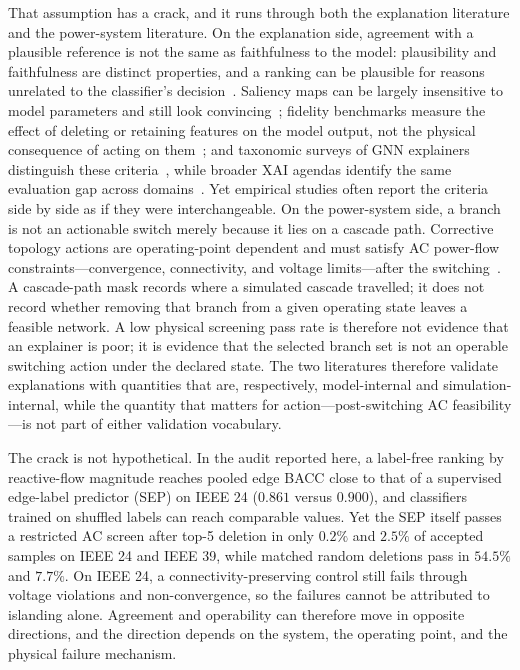 That assumption has a crack, and it runs through both the explanation literature and the power-system literature. On the explanation side, agreement with a plausible reference is not the same as faithfulness to the model: plausibility and faithfulness are distinct properties, and a ranking can be plausible for reasons unrelated to the classifier's decision~\citep{jacovi2020,doshi2017,rudin2019}. Saliency maps can be largely insensitive to model parameters and still look convincing~\citep{adebayo2018}; fidelity benchmarks measure the effect of deleting or retaining features on the model output, not the physical consequence of acting on them~\citep{hooker2019,samek2017}; and taxonomic surveys of GNN explainers distinguish these criteria~\citep{yuan2022}, while broader XAI agendas identify the same evaluation gap across domains~\citep{longo2024}. Yet empirical studies often report the criteria side by side as if they were interchangeable. On the power-system side, a branch is not an actionable switch merely because it lies on a cascade path. Corrective topology actions are operating-point dependent and must satisfy AC power-flow constraints---convergence, connectivity, and voltage limits---after the switching~\citep{rolim1999,li2019,korad2013,li2017}. A cascade-path mask records where a simulated cascade travelled; it does not record whether removing that branch from a given operating state leaves a feasible network. A low physical screening pass rate is therefore not evidence that an explainer is poor; it is evidence that the selected branch set is not an operable switching action under the declared state. The two literatures therefore validate explanations with quantities that are, respectively, model-internal and simulation-internal, while the quantity that matters for action---post-switching AC feasibility---is not part of either validation vocabulary.

The crack is not hypothetical. In the audit reported here, a label-free ranking by reactive-flow magnitude reaches pooled edge BACC close to that of a supervised edge-label predictor (SEP) on IEEE 24 ($0.861$ versus $0.900$), and classifiers trained on shuffled labels can reach comparable values. Yet the SEP itself passes a restricted AC screen after top-5 deletion in only $0.2\%$ and $2.5\%$ of accepted samples on IEEE 24 and IEEE 39, while matched random deletions pass in $54.5\%$ and $7.7\%$. On IEEE 24, a connectivity-preserving control still fails through voltage violations and non-convergence, so the failures cannot be attributed to islanding alone. Agreement and operability can therefore move in opposite directions, and the direction depends on the system, the operating point, and the physical failure mechanism.

